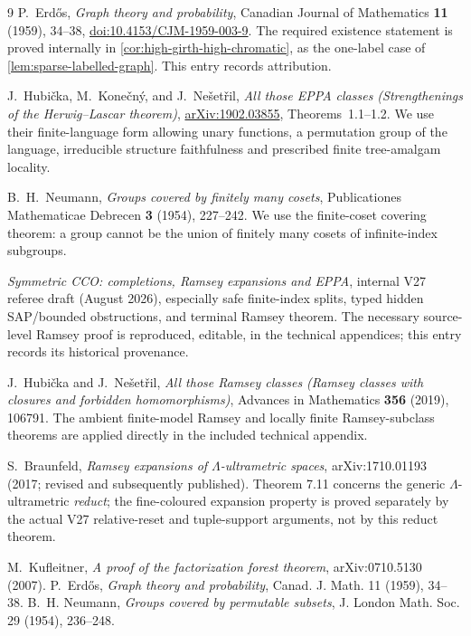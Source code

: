 \documentclass[11pt,a4paper]{article}
\theoremstyle{remark}\newtheorem{remark}[theorem]{Remark}
\theoremstyle{definition}
\theoremstyle{remark}
\begin{document}
\begin{thebibliography}{9}
\small
{}
P.~Erd\H{o}s, \emph{Graph theory and probability},
Canadian Journal of Mathematics \textbf{11} (1959), 34--38,
\href{https://doi.org/10.4153/CJM-1959-003-9}{doi:10.4153/CJM-1959-003-9}.
The required existence statement is proved internally in
\cref{cor:high-girth-high-chromatic}, as the one-label case of
\cref{lem:sparse-labelled-graph}. This entry records attribution.

J.~Hubi\v{c}ka, M.~Kone\v{c}n\'y, and J.~Ne\v{s}et\v{r}il,
\emph{All those EPPA classes (Strengthenings of the
Herwig--Lascar theorem)},
\href{https://arxiv.org/abs/1902.03855}{arXiv:1902.03855},
Theorems~1.1--1.2.  We use their finite-language form allowing
unary functions, a permutation group of the language, irreducible
structure faithfulness and prescribed finite tree-amalgam locality.

B.~H.~Neumann, \emph{Groups covered by finitely many cosets},
Publicationes Mathematicae Debrecen \textbf{3} (1954), 227--242.
We use the finite-coset covering theorem: a group cannot be the
union of finitely many cosets of infinite-index subgroups.

\emph{Symmetric CCO: completions, Ramsey expansions and EPPA},
internal V27 referee draft (August 2026), especially safe finite-index
splits, typed hidden SAP/bounded obstructions, and terminal Ramsey theorem.
The necessary source-level Ramsey proof is reproduced, editable, in
the technical appendices; this entry records its historical provenance.

J.~Hubi\v{c}ka and J.~Ne\v{s}et\v{r}il,
\emph{All those Ramsey classes (Ramsey classes with closures and
forbidden homomorphisms)}, Advances in Mathematics \textbf{356}
(2019), 106791.  The ambient finite-model Ramsey and locally finite
Ramsey-subclass theorems are applied directly in the included technical
appendix.

S.~Braunfeld, \emph{Ramsey expansions of $\Lambda$-ultrametric
spaces}, arXiv:1710.01193 (2017; revised and subsequently published).
Theorem 7.11 concerns the generic $\Lambda$-ultrametric
\emph{reduct}; the fine-coloured expansion property is proved
separately by the actual V27 relative-reset and tuple-support arguments,
not by this reduct theorem.

M.~Kufleitner, \emph{A proof of the factorization forest theorem},
arXiv:0710.5130 (2007).
P.~Erd\H{o}s, \emph{Graph theory and probability},
Canad. J. Math. 11 (1959), 34--38.
B.~H. Neumann, \emph{Groups covered by permutable subsets},
J. London Math. Soc. 29 (1954), 236--248.

\end{thebibliography}
\end{document}
